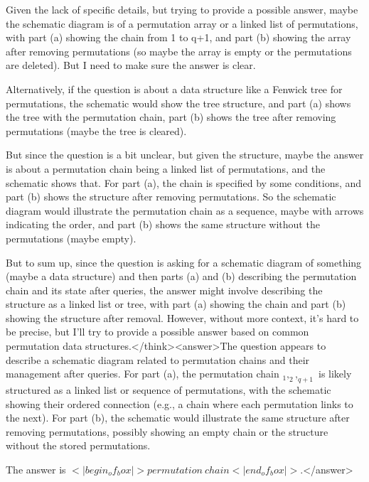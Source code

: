 Given the lack of specific details, but trying to provide a possible answer, maybe the schematic diagram is of a permutation array or a linked list of permutations, with part (a) showing the chain from 1 to q+1, and part (b) showing the array after removing permutations (so maybe the array is empty or the permutations are deleted). But I need to make sure the answer is clear.

Alternatively, if the question is about a data structure like a Fenwick tree for permutations, the schematic would show the tree structure, and part (a) shows the tree with the permutation chain, part (b) shows the tree after removing permutations (maybe the tree is cleared).

But since the question is a bit unclear, but given the structure, maybe the answer is about a permutation chain being a linked list of permutations, and the schematic shows that. For part (a), the chain is specified by some conditions, and part (b) shows the structure after removing permutations. So the schematic diagram would illustrate the permutation chain as a sequence, maybe with arrows indicating the order, and part (b) shows the same structure without the permutations (maybe empty).

But to sum up, since the question is asking for a schematic diagram of something (maybe a data structure) and then parts (a) and (b) describing the permutation chain and its state after queries, the answer might involve describing the structure as a linked list or tree, with part (a) showing the chain and part (b) showing the structure after removal. However, without more context, it's hard to be precise, but I'll try to provide a possible answer based on common permutation data structures.</think><answer>The question appears to describe a schematic diagram related to permutation chains and their management after queries. For part (a), the permutation chain \( _1, _2, _{q+1} \) is likely structured as a linked list or sequence of permutations, with the schematic showing their ordered connection (e.g., a chain where each permutation links to the next). For part (b), the schematic would illustrate the same structure after removing permutations, possibly showing an empty chain or the structure without the stored permutations.  

The answer is \(<|begin_of_box|>permutation\ chain<|end_of_box|>\).</answer>